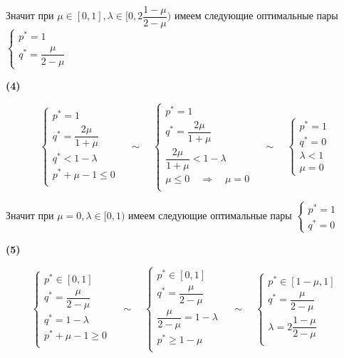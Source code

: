 Значит при $\mu \in [0, 1], \lambda \in [0, 2\dfrac{1 - \mu}{2 - \mu})$
имеем следующие оптимальные пары
$\begin{cases}
	p^* = 1 \\
	q^* = \dfrac{\mu}{2 - \mu}
\end{cases}$

\textbf{(4)}

$$
	\begin{cases}
		p^* = 1 \\
		q^* = \dfrac{2\mu}{1 + \mu} \\
		q^* < 1 - \lambda \\
		p^* + \mu - 1 \leqslant 0 \\
	\end{cases}
	\quad \sim \quad
	\begin{cases}
		p^* = 1 \\
		q^* = \dfrac{2\mu}{1 + \mu} \\
		\dfrac{2\mu}{1 + \mu} < 1 - \lambda \\
		\mu \leqslant 0 \quad \Rightarrow \quad \mu = 0 \\
	\end{cases}
	\quad \sim \quad
	\begin{cases}
		p^* = 1 \\
		q^* = 0 \\
		\lambda < 1 \\
		\mu = 0
	\end{cases}
$$

Значит при $\mu=0, \lambda \in [0, 1)$ имеем следующие оптимальные пары
$\begin{cases}
	p^* = 1 \\
	q^* = 0 
\end{cases}$

\textbf{(5)}

$$
	\begin{cases}
		p^* \in [0, 1] \\
		q^* = \dfrac{\mu}{2 - \mu} \\
		q^* = 1 - \lambda \\
		p^* + \mu - 1 \geqslant 0 \\
	\end{cases}
	\quad \sim \quad
	\begin{cases}
		p^* \in [0, 1] \\
		q^* = \dfrac{\mu}{2 - \mu} \\
		\dfrac{\mu}{2 - \mu} = 1 - \lambda \\
		p^* \geqslant 1 - \mu \\
	\end{cases}
	\quad \sim \quad
	\begin{cases}
		p^* \in [1 - \mu, 1] \\
		q^* = \dfrac{\mu}{2 - \mu} \\
		\lambda = 2\dfrac{1 - \mu}{2 - \mu} \\
	\end{cases}
$$

